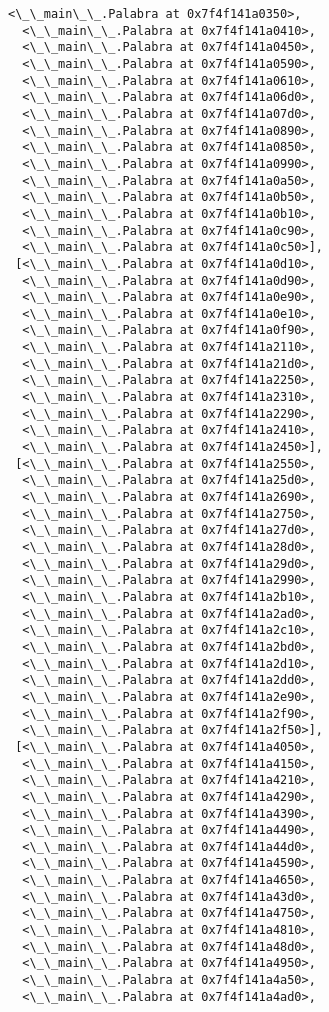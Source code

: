 \documentclass[12pt,a4paper,table]{article}
\begin{document}
\begin{tcolorbox}[breakable, size=fbox, boxrule=.5pt, pad at break*=1mm, opacityfill=0]
\begin{Verbatim}[commandchars=\\\{\}]
  <\_\_main\_\_.Palabra at 0x7f4f141a0350>,
  <\_\_main\_\_.Palabra at 0x7f4f141a0410>,
  <\_\_main\_\_.Palabra at 0x7f4f141a0450>,
  <\_\_main\_\_.Palabra at 0x7f4f141a0590>,
  <\_\_main\_\_.Palabra at 0x7f4f141a0610>,
  <\_\_main\_\_.Palabra at 0x7f4f141a06d0>,
  <\_\_main\_\_.Palabra at 0x7f4f141a07d0>,
  <\_\_main\_\_.Palabra at 0x7f4f141a0890>,
  <\_\_main\_\_.Palabra at 0x7f4f141a0850>,
  <\_\_main\_\_.Palabra at 0x7f4f141a0990>,
  <\_\_main\_\_.Palabra at 0x7f4f141a0a50>,
  <\_\_main\_\_.Palabra at 0x7f4f141a0b50>,
  <\_\_main\_\_.Palabra at 0x7f4f141a0b10>,
  <\_\_main\_\_.Palabra at 0x7f4f141a0c90>,
  <\_\_main\_\_.Palabra at 0x7f4f141a0c50>],
 [<\_\_main\_\_.Palabra at 0x7f4f141a0d10>,
  <\_\_main\_\_.Palabra at 0x7f4f141a0d90>,
  <\_\_main\_\_.Palabra at 0x7f4f141a0e90>,
  <\_\_main\_\_.Palabra at 0x7f4f141a0e10>,
  <\_\_main\_\_.Palabra at 0x7f4f141a0f90>,
  <\_\_main\_\_.Palabra at 0x7f4f141a2110>,
  <\_\_main\_\_.Palabra at 0x7f4f141a21d0>,
  <\_\_main\_\_.Palabra at 0x7f4f141a2250>,
  <\_\_main\_\_.Palabra at 0x7f4f141a2310>,
  <\_\_main\_\_.Palabra at 0x7f4f141a2290>,
  <\_\_main\_\_.Palabra at 0x7f4f141a2410>,
  <\_\_main\_\_.Palabra at 0x7f4f141a2450>],
 [<\_\_main\_\_.Palabra at 0x7f4f141a2550>,
  <\_\_main\_\_.Palabra at 0x7f4f141a25d0>,
  <\_\_main\_\_.Palabra at 0x7f4f141a2690>,
  <\_\_main\_\_.Palabra at 0x7f4f141a2750>,
  <\_\_main\_\_.Palabra at 0x7f4f141a27d0>,
  <\_\_main\_\_.Palabra at 0x7f4f141a28d0>,
  <\_\_main\_\_.Palabra at 0x7f4f141a29d0>,
  <\_\_main\_\_.Palabra at 0x7f4f141a2990>,
  <\_\_main\_\_.Palabra at 0x7f4f141a2b10>,
  <\_\_main\_\_.Palabra at 0x7f4f141a2ad0>,
  <\_\_main\_\_.Palabra at 0x7f4f141a2c10>,
  <\_\_main\_\_.Palabra at 0x7f4f141a2bd0>,
  <\_\_main\_\_.Palabra at 0x7f4f141a2d10>,
  <\_\_main\_\_.Palabra at 0x7f4f141a2dd0>,
  <\_\_main\_\_.Palabra at 0x7f4f141a2e90>,
  <\_\_main\_\_.Palabra at 0x7f4f141a2f90>,
  <\_\_main\_\_.Palabra at 0x7f4f141a2f50>],
 [<\_\_main\_\_.Palabra at 0x7f4f141a4050>,
  <\_\_main\_\_.Palabra at 0x7f4f141a4150>,
  <\_\_main\_\_.Palabra at 0x7f4f141a4210>,
  <\_\_main\_\_.Palabra at 0x7f4f141a4290>,
  <\_\_main\_\_.Palabra at 0x7f4f141a4390>,
  <\_\_main\_\_.Palabra at 0x7f4f141a4490>,
  <\_\_main\_\_.Palabra at 0x7f4f141a44d0>,
  <\_\_main\_\_.Palabra at 0x7f4f141a4590>,
  <\_\_main\_\_.Palabra at 0x7f4f141a4650>,
  <\_\_main\_\_.Palabra at 0x7f4f141a43d0>,
  <\_\_main\_\_.Palabra at 0x7f4f141a4750>,
  <\_\_main\_\_.Palabra at 0x7f4f141a4810>,
  <\_\_main\_\_.Palabra at 0x7f4f141a48d0>,
  <\_\_main\_\_.Palabra at 0x7f4f141a4950>,
  <\_\_main\_\_.Palabra at 0x7f4f141a4a50>,
  <\_\_main\_\_.Palabra at 0x7f4f141a4ad0>,

\end{Verbatim}
\end{tcolorbox}
\end{document}
